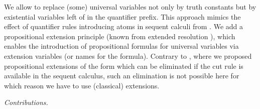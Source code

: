\documentclass{llncs}
\begin{document}
We allow to replace (some) universal variables  not only by truth
constants but by existential variables left of  in the quantifier
prefix. This approach mimics the effect of quantifier rules
introducing atoms in sequent calculi from \cite{DBLP:conf/sat/Egly12}.
We add a propositional extension principle (known from extended
resolution \cite{Tseitin:1968}), which enables the introduction of
propositional formulas for universal variables via extension variables
(or names for the formula).  Contrary to \cite{DBLP:conf/sat/Egly12},
where we proposed propositional extensions of the form  which can be eliminated if the cut rule is available in
the sequent calculus, such an elimination is not possible here for
which reason we have to use (classical) extensions.

\smallskip
\noindent
\emph{Contributions.}
\vspace*{-0.5em}
\end{document}
